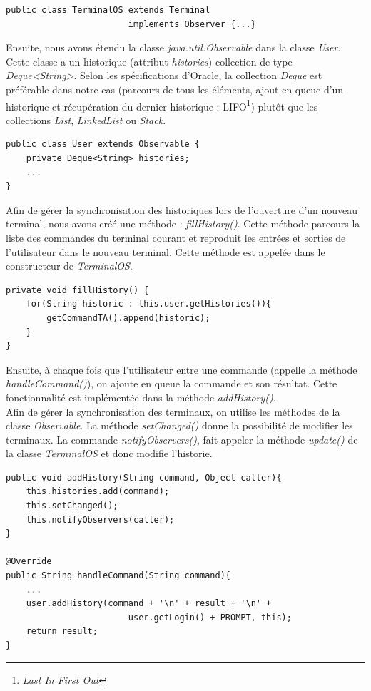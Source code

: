 \begin{lstlisting}
public class TerminalOS extends Terminal 
						implements Observer {...}
\end{lstlisting}

Ensuite, nous avons étendu la classe \emph{java.util.Observable} dans la classe \emph{User}. Cette classe a un historique (attribut \emph{histories}) collection de type \emph{Deque<String>}. Selon les spécifications d'Oracle, la collection \emph{Deque} est préférable dans notre cas (parcours de tous les éléments, ajout en queue d'un historique et récupération du dernier historique : LIFO\footnote{\emph{Last In First Out}}) plutôt que les collections \emph{List}, \emph{LinkedList} ou \emph{Stack}.

\begin{lstlisting}
public class User extends Observable {
    private Deque<String> histories;
    ...
}
\end{lstlisting}

Afin de gérer la synchronisation des historiques lors de l'ouverture d'un nouveau terminal, nous avons créé une méthode : \emph{fillHistory()}. Cette méthode parcours la liste des commandes du terminal courant et reproduit les entrées et sorties de l'utilisateur dans le nouveau terminal. Cette méthode est appelée dans le constructeur de \emph{TerminalOS}.

\begin{lstlisting}
private void fillHistory() {
	for(String historic : this.user.getHistories()){
		getCommandTA().append(historic);
	}
}
\end{lstlisting}

Ensuite, à chaque fois que l'utilisateur entre une commande (appelle la méthode \emph{handleCommand()}), on ajoute en queue la commande et son résultat. Cette fonctionnalité est implémentée dans la méthode \emph{addHistory()}.\\

Afin de gérer la synchronisation des terminaux, on utilise les méthodes de la classe \emph{Observable}. La méthode \emph{setChanged()} donne la possibilité de modifier les terminaux. La commande \emph{notifyObservers()}, fait appeler la méthode \emph{update()} de la classe \emph{TerminalOS} et donc modifie l'historie.

\begin{lstlisting}
public void addHistory(String command, Object caller){
    this.histories.add(command);
    this.setChanged();
    this.notifyObservers(caller);
}

@Override
public String handleCommand(String command){
	...
	user.addHistory(command + '\n' + result + '\n' + 
						user.getLogin() + PROMPT, this);
	return result;
}
\end{lstlisting}

